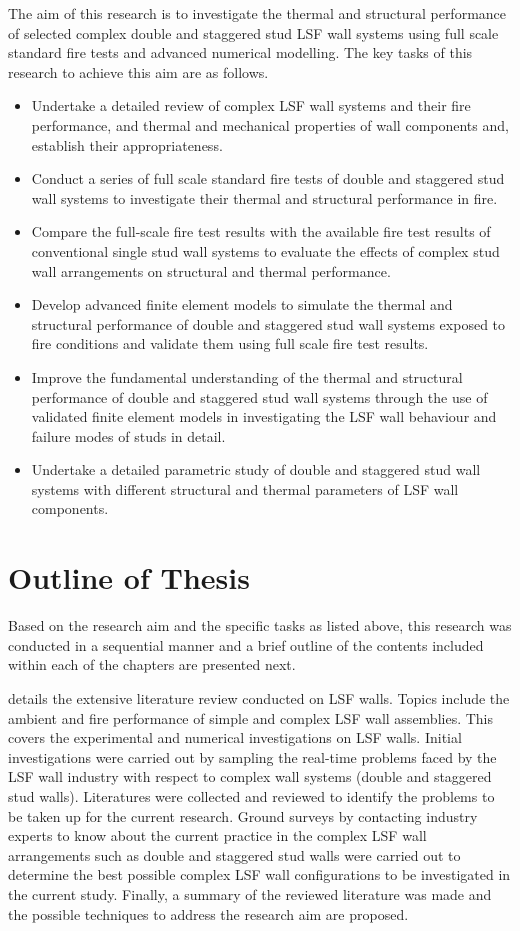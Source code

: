The aim of this research is to investigate the thermal and structural performance of selected complex double and staggered stud LSF wall systems using full scale standard fire tests and advanced numerical modelling. The key tasks of this research to achieve this aim are as follows. 
\begin{itemize}
	\item Undertake a detailed review of complex LSF wall systems and their fire performance, and thermal and mechanical properties of wall components and, establish their appropriateness.
	\item Conduct a series of full scale standard fire tests of double and staggered stud wall systems to investigate their thermal and structural performance in fire. 
	\item Compare the full-scale fire test results with the available fire test results of conventional single stud wall systems to evaluate the effects of complex stud wall arrangements on structural and thermal performance.  
	\item Develop advanced finite element models to simulate the thermal and structural performance of double and staggered stud wall systems exposed to fire conditions and validate them using full scale fire test results.
	\item Improve the fundamental understanding of the thermal and structural performance of double and staggered stud wall systems through the use of validated finite element models in investigating the LSF wall behaviour and failure modes of studs in detail.
	\item Undertake a detailed parametric study of double and staggered stud wall systems with different structural and thermal parameters of LSF wall components. 
\end{itemize}

\section{Outline of Thesis}

Based on the research aim and the specific tasks as listed above, this research was conducted in a sequential manner and a brief outline of the contents included within each of the chapters are presented next.

\textbf{} details the extensive literature review conducted on LSF walls. Topics include the ambient and fire performance of simple and complex LSF wall assemblies. This covers the experimental and numerical investigations on LSF walls. Initial investigations were carried out by sampling the real-time problems faced by the LSF wall industry with respect to complex wall systems (double and staggered stud walls). Literatures were collected and reviewed to identify the problems to be taken up for the current research. Ground surveys by contacting industry experts to know about the current practice in the complex LSF wall arrangements such as double and staggered stud walls were carried out to determine the best possible complex LSF wall configurations to be investigated in the current study. Finally, a summary of the reviewed literature was made and the possible techniques to address the research aim are proposed.

